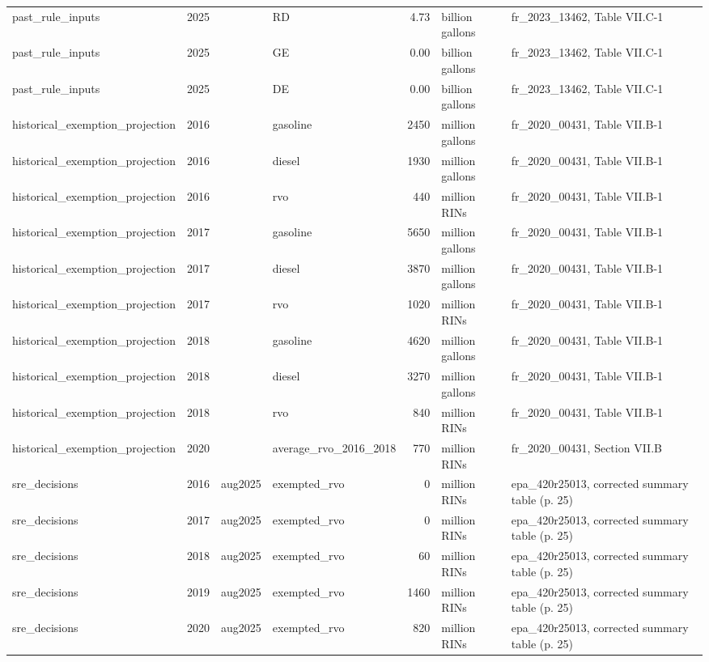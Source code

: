 \begin{longtable}{p{2.3cm}p{0.7cm}p{1.0cm}p{2.6cm}rp{1.7cm}p{4.6cm}}
past\_rule\_inputs & 2025 &  & RD & 4.73 & billion gallons & fr\_2023\_13462, Table VII.C-1 \\
past\_rule\_inputs & 2025 &  & GE & 0.00 & billion gallons & fr\_2023\_13462, Table VII.C-1 \\
past\_rule\_inputs & 2025 &  & DE & 0.00 & billion gallons & fr\_2023\_13462, Table VII.C-1 \\
historical\_exemption\_projection & 2016 &  & gasoline & 2450 & million gallons & fr\_2020\_00431, Table VII.B-1 \\
historical\_exemption\_projection & 2016 &  & diesel & 1930 & million gallons & fr\_2020\_00431, Table VII.B-1 \\
historical\_exemption\_projection & 2016 &  & rvo & 440 & million RINs & fr\_2020\_00431, Table VII.B-1 \\
historical\_exemption\_projection & 2017 &  & gasoline & 5650 & million gallons & fr\_2020\_00431, Table VII.B-1 \\
historical\_exemption\_projection & 2017 &  & diesel & 3870 & million gallons & fr\_2020\_00431, Table VII.B-1 \\
historical\_exemption\_projection & 2017 &  & rvo & 1020 & million RINs & fr\_2020\_00431, Table VII.B-1 \\
historical\_exemption\_projection & 2018 &  & gasoline & 4620 & million gallons & fr\_2020\_00431, Table VII.B-1 \\
historical\_exemption\_projection & 2018 &  & diesel & 3270 & million gallons & fr\_2020\_00431, Table VII.B-1 \\
historical\_exemption\_projection & 2018 &  & rvo & 840 & million RINs & fr\_2020\_00431, Table VII.B-1 \\
historical\_exemption\_projection & 2020 &  & average\_rvo\_2016\_2018 & 770 & million RINs & fr\_2020\_00431, Section VII.B \\
sre\_decisions & 2016 & aug2025 & exempted\_rvo & 0 & million RINs & epa\_420r25013, corrected summary table (p. 25) \\
sre\_decisions & 2017 & aug2025 & exempted\_rvo & 0 & million RINs & epa\_420r25013, corrected summary table (p. 25) \\
sre\_decisions & 2018 & aug2025 & exempted\_rvo & 60 & million RINs & epa\_420r25013, corrected summary table (p. 25) \\
sre\_decisions & 2019 & aug2025 & exempted\_rvo & 1460 & million RINs & epa\_420r25013, corrected summary table (p. 25) \\
sre\_decisions & 2020 & aug2025 & exempted\_rvo & 820 & million RINs & epa\_420r25013, corrected summary table (p. 25) \\

\end{longtable}

